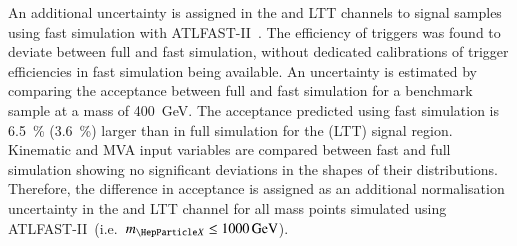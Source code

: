 An additional uncertainty is assigned in the \hadhad and \lephad LTT
channels to signal samples using fast simulation with
\textsc{ATLFAST-II}~\cite{SOFT-2010-01}. The efficiency of \tauhadvis
triggers was found to deviate between full and fast simulation,
without dedicated calibrations of \tauhadvis trigger efficiencies in
fast simulation being available. An uncertainty is estimated by
comparing the acceptance between full and fast simulation for a
benchmark sample at a mass of \SI{400}{\GeV}. The acceptance predicted
using fast simulation is \SI{6.5}{\percent} (\SI{3.6}{\percent})
larger than in full simulation for the \hadhad (\lephad LTT) signal
region. Kinematic and MVA input variables are compared between fast
and full simulation showing no significant deviations in the shapes of
their distributions. Therefore, the difference in acceptance is
assigned as an additional normalisation uncertainty in the \hadhad and
\lephad LTT channel for all mass points simulated using
\textsc{ATLFAST-II}~(i.e.\ $\mX \leq \SI{1000}{\GeV}$).

